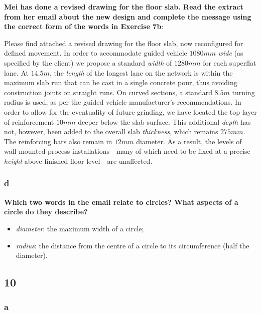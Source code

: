 \textbf{Mei has done a revised drawing for the floor slab. Read the extract from her email about the new design and complete the message using the correct form of the words in Exercise 7b}:

Please find attached a revised drawing for the floor slab, now reconfigured for defined movement. In order to accommodate guided vehicle $1080mm$ \textit{wide} (as specified by the client) we propose a standard \textit{width} of $1280mm$ for each superflat lane. At $14.5m$, the \textit{length} of the longest lane on the network is within the maximum slab run that can be cast in a single concrete pour, thus avoiding construction joints on straight runs. On curved sections, a standard $8.5m$ turning radius is used, as per the guided vehicle manufacturer's recommendations.
In order to allow for the eventuality of future grinding, we have located the top layer of reinforcement $10mm$ deeper below the slab surface. This additional \textit{depth} has not, however, been added to the overall slab \textit{thickness}, which remains $275mm$. The reinforcing bars also remain in $12mm$ diameter. As a result, the levels of wall-mounted process installations - many of which need to be fixed at a precise \textit{height} above finished floor level - are unaffected.

\subsubsection{d}

\textbf{Which two words in the email relate to circles? What aspects of a circle do they describe?}

\begin{itemize}

\item\textit{diameter}: the maximum width of a circle;
\item\textit{radius}: the distance from the centre of a circle to its circumference (half the diameter).

\end{itemize}

\subsection{10}

\subsubsection{a}

